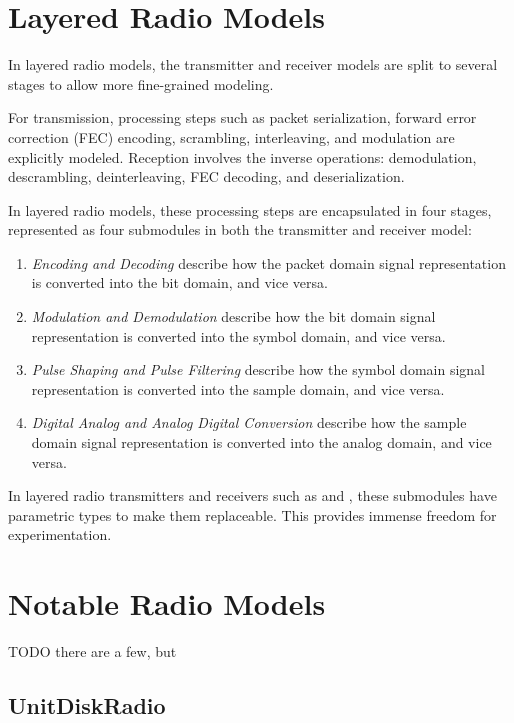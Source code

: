 \section{Layered Radio Models}

In layered radio models, the transmitter and receiver models are split
to several stages to allow more fine-grained modeling. 

For transmission, processing steps such as packet serialization, 
forward error correction (FEC) encoding, scrambling, interleaving, and 
modulation are explicitly modeled. Reception involves the inverse
operations: demodulation, descrambling, deinterleaving, 
FEC decoding, and deserialization.

In layered radio models, these processing steps are encapsulated
in four stages, represented as four submodules in both the 
transmitter and receiver model: 

\begin{enumerate}
  \item \textit{Encoding and Decoding} describe how the packet domain 
    signal representation is converted into the bit domain, and vice versa.
  \item \textit{Modulation and Demodulation} describe how the bit domain
    signal representation is converted into the symbol domain, and vice versa.
  \item \textit{Pulse Shaping and Pulse Filtering} describe how the 
    symbol domain signal representation is converted into the sample domain, 
    and vice versa.
  \item \textit{Digital Analog and Analog Digital Conversion} describe 
    how the sample domain signal representation is converted into the 
    analog domain, and vice versa.
\end{enumerate}

In layered radio transmitters and receivers such as 
and , these submodules have parametric
types to make them replaceable. This provides immense freedom for 
experimentation.

\section{Notable Radio Models}

TODO there are a few, but 

\subsection{UnitDiskRadio}

